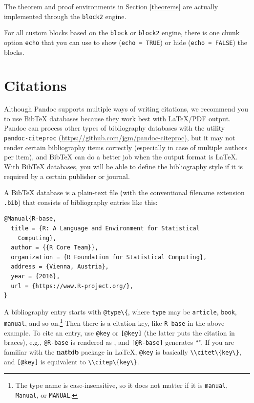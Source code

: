 \documentclass[doctor,openright,twoside]{sjtuthesis}
\newcommand{\passthrough}[1]{#1}
\theoremstyle{plain}
\theoremstyle{definition}
\theoremstyle{remark}
\theoremstyle{ocrenumbox}
\theoremstyle{plain}
\begin{document}
The theorem and proof environments in Section \ref{theorems} are
actually implemented through the \passthrough{\lstinline!block2!}
engine.

For all custom blocks based on the \passthrough{\lstinline!block!} or
\passthrough{\lstinline!block2!} engine, there is one chunk option
\passthrough{\lstinline!echo!} that you can use to show
(\passthrough{\lstinline!echo = TRUE!}) or hide
(\passthrough{\lstinline!echo = FALSE!}) the blocks.

\hypertarget{citations}{%
\section{Citations}\label{citations}}

Although Pandoc supports multiple ways of writing
citations, we recommend you to use BibTeX
databases because they work best with LaTeX/PDF output. Pandoc can
process other types of bibliography databases with the utility
\passthrough{\lstinline!pandoc-citeproc!}
(\url{https://github.com/jgm/pandoc-citeproc}), but it may not render
certain bibliography items correctly (especially in case of multiple
authors per item), and BibTeX can do a better job when the output format
is LaTeX. With BibTeX databases, you will be able to define the
bibliography style if it is required by a certain publisher or journal.

A BibTeX database is a plain-text file (with the conventional filename
extension \passthrough{\lstinline!.bib!}) that consists of bibliography
entries like this:

\begin{lstlisting}
@Manual{R-base,
  title = {R: A Language and Environment for Statistical
    Computing},
  author = {{R Core Team}},
  organization = {R Foundation for Statistical Computing},
  address = {Vienna, Austria},
  year = {2016},
  url = {https://www.R-project.org/},
}
\end{lstlisting}

A bibliography entry starts with \passthrough{\lstinline!@type\{!},
where \passthrough{\lstinline!type!} may be
\passthrough{\lstinline!article!}, \passthrough{\lstinline!book!},
\passthrough{\lstinline!manual!}, and so on.\footnote{The type name is
  case-insensitive, so it does not matter if it is
  \passthrough{\lstinline!manual!}, \passthrough{\lstinline!Manual!}, or
  \passthrough{\lstinline!MANUAL!}.} Then there is a citation key, like
\passthrough{\lstinline!R-base!} in the above example. To cite an entry,
use \passthrough{\lstinline!@key!} or \passthrough{\lstinline![@key]!}
(the latter puts the citation in braces), e.g.,
\passthrough{\lstinline!@R-base!} is rendered as \textcite{R-base}, and
\passthrough{\lstinline![@R-base]!} generates ``\autocite{R-base}''. If
you are familiar with the \textbf{natbib} package in LaTeX,
\passthrough{\lstinline!@key!} is basically
\passthrough{\lstinline!\\citet\{key\}!}, and
\passthrough{\lstinline![@key]!} is equivalent to
\passthrough{\lstinline!\\citep\{key\}!}.
\end{document}

